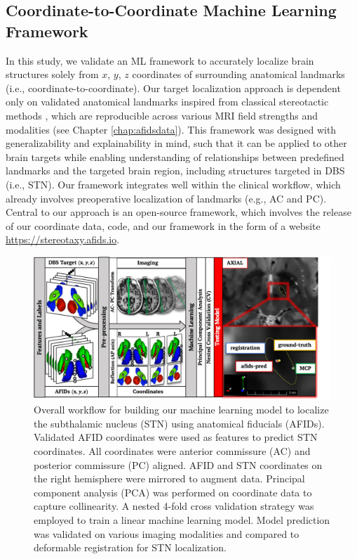 \subsection{Coordinate-to-Coordinate Machine Learning Framework}
In this study, we validate an ML framework to accurately localize brain structures solely from $x$, $y$, $z$ coordinates of surrounding anatomical landmarks (i.e., coordinate-to-coordinate). Our target localization approach is dependent only on validated anatomical landmarks inspired from classical stereotactic methods \cite{Lau2019-eh, Abbass2022-lf}, which are reproducible across various MRI field strengths and modalities (see Chapter \ref{chap:afidsdata}). This framework was designed with generalizability and explainability in mind, such that it can be applied to other brain targets while enabling understanding of relationships between predefined landmarks and the targeted brain region, including structures targeted in DBS (i.e., STN). Our framework integrates well within the clinical workflow, which already involves preoperative localization of landmarks (e.g., AC and PC). Central to our approach is an open-source framework, which involves the release of our coordinate data, code, and our framework in the form of a website \url{https://stereotaxy.afids.io}.

\begin{figure}[hbt!]
    \centering
    \includegraphics[width=1\linewidth]{figs/ch4_Figure_afidspred.png}
    \caption{Overall workflow for building our machine learning model to localize the subthalamic nucleus (STN) using anatomical fiducials (AFIDs). Validated AFID coordinates were used as features to predict STN coordinates. All coordinates were anterior commissure (AC) and posterior commissure (PC) aligned. AFID and STN coordinates on the right hemisphere were mirrored to augment data. Principal component analysis (PCA) was performed on coordinate data to capture collinearity. A nested 4-fold cross validation strategy was employed to train a linear machine learning model. Model prediction was validated on various imaging modalities and compared to deformable registration for STN localization.}
    \label{fig:ch4_Figure_afidspred}
\end{figure}

